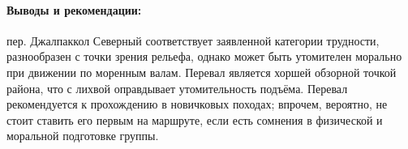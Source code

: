  \paragraph{Выводы и рекомендации:} пер. Джалпаккол Северный соответствует заявленной категории трудности, разнообразен с точки зрения рельефа, однако может быть утомителен морально при движении по моренным валам. Перевал является хоршей обзорной точкой района, что с лихвой оправдывает утомительность подъёма. Перевал рекомендуется к прохождению в новичковых походах; впрочем, вероятно, не стоит ставить его первым на маршруте, если есть сомнения в физической и моральной подготовке группы.
 
\clearpage
